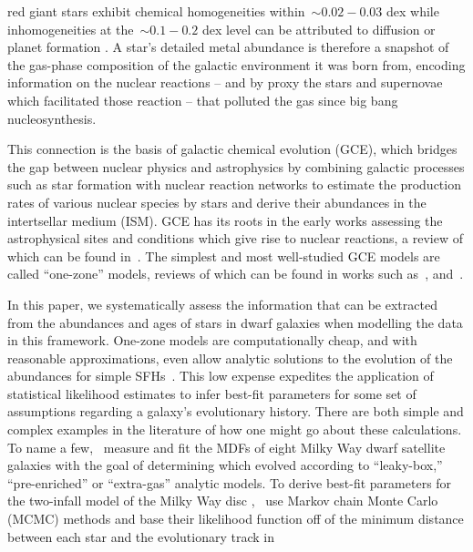 \documentclass[ms.tex]{subfiles}
\begin{document}
red giant stars exhibit chemical homogeneities within~$\sim0.02 - 0.03$ dex
\citep{DeSilva2006, Bovy2016, Liu2016b, Casamiquela2020} while inhomogeneities
at the~$\sim0.1 - 0.2$ dex level can be attributed to diffusion
\citep{BertelliMotta2018, Liu2019, Souto2019} or planet formation
\citep{Melendez2009, Liu2016a, Spina2018}.
A star's detailed metal abundance is therefore a snapshot of the gas-phase
composition of the galactic environment it was born from, encoding information
on the nuclear reactions -- and by proxy the stars and supernovae which
facilitated those reaction -- that polluted the gas since big bang
nucleosynthesis.
\par
This connection is the basis of galactic chemical evolution (GCE), which
bridges the gap between nuclear physics and astrophysics by combining galactic
processes such as star formation with nuclear reaction networks to estimate the
production rates of various nuclear species by stars and derive their
abundances in the intertsellar medium (ISM).
GCE has its roots in the early works assessing the astrophysical sites and
conditions which give rise to nuclear reactions, a review of which can be
found in~\citep[][the famous ``B2FH'' paper]{Burbidge1957}.
The simplest and most well-studied GCE models are called ``one-zone'' models,
reviews of which can be found in works such as~\citet{Tinsley1980},
\citet{Pagel2009} and~\citet{Matteucci2012, Matteucci2021}.
\par
In this paper, we systematically assess the information that can be extracted
from the abundances and ages of stars in dwarf galaxies when modelling the
data in this framework.
One-zone models are computationally cheap, and with reasonable approximations,
even allow analytic solutions to the evolution of the abundances for simple
SFHs~\citep*[e.g.][]{Weinberg2017}.
This low expense expedites the application of statistical likelihood estimates
to infer best-fit parameters for some set of assumptions regarding a galaxy's
evolutionary history.
There are both simple and complex examples in the literature of how one might
go about these calculations.
To name a few,~\citet{Kirby2011} measure and fit the MDFs of eight Milky Way
dwarf satellite galaxies with the goal of determining which evolved according
to ``leaky-box,'' ``pre-enriched'' or ``extra-gas'' analytic models.
To derive best-fit parameters for the two-infall model of the Milky Way disc
\citep[e.g.][]{Chiappini1997},~\citet{Spitoni2020, Spitoni2021} use Markov
chain Monte Carlo (MCMC) methods and base their likelihood function off of the
minimum distance between each star and the evolutionary track in
\end{document}
